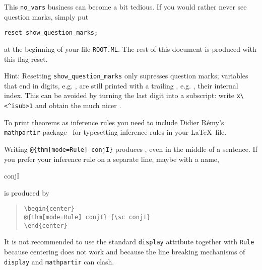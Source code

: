 \begin{isabellebody}
\begin{isamarkuptext}
This \verb!no_vars! business can become a bit tedious.
If you would rather never see question marks, simply put
\begin{verbatim}
reset show_question_marks;
\end{verbatim}
at the beginning of your file \texttt{ROOT.ML}.
The rest of this document is produced with this flag reset.

Hint: Resetting \verb!show_question_marks! only supresses question
marks; variables that end in digits, e.g. , are still
printed with a trailing , e.g. , their
internal index. This can be avoided by turning the last digit into a
subscript: write \verb!x\<^isub>1! and obtain the much nicer .%
\end{isamarkuptext}%
\isamarkuptrue%
\isamarkupfalse%
%
\isamarkuptrue%
%
\begin{isamarkuptext}%
To print theorems as inference rules you need to include Didier
R\'emy's \texttt{mathpartir} package~\cite{mathpartir}
for typesetting inference rules in your \LaTeX\ file.

Writing \verb!@!\verb!{thm[mode=Rule] conjI}! produces
, even in the middle of a sentence.
If you prefer your inference rule on a separate line, maybe with a name,
\begin{center}
 {\sc conjI}
\end{center}
is produced by
\begin{quote}
\verb!\begin{center}!\\
\verb!@!\verb!{thm[mode=Rule] conjI} {\sc conjI}!\\
\verb!\end{center}!
\end{quote}
It is not recommended to use the standard \texttt{display} attribute
together with \texttt{Rule} because centering does not work and because
the line breaking mechanisms of \texttt{display} and \texttt{mathpartir} can
clash.


\end{isamarkuptext}
\end{isabellebody}
